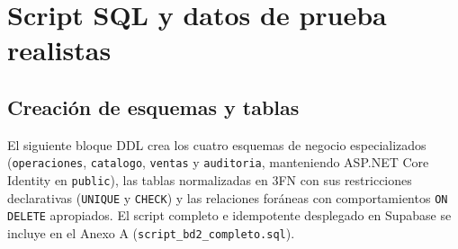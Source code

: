 
\section{Script SQL y datos de prueba realistas}

\subsection{Creaci\'on de esquemas y tablas}

El siguiente bloque DDL crea los cuatro esquemas de negocio especializados (\texttt{operaciones}, \texttt{catalogo}, \texttt{ventas} y \texttt{auditoria}, manteniendo ASP.NET Core Identity en \texttt{public}), las tablas normalizadas en 3FN con sus restricciones declarativas (\texttt{UNIQUE} y \texttt{CHECK}) y las relaciones for\'aneas con comportamientos \texttt{ON DELETE} apropiados.
El script completo e idempotente desplegado en Supabase se incluye en el Anexo A (\texttt{script\_bd2\_completo.sql}).

